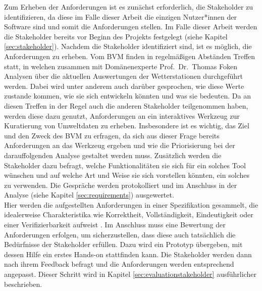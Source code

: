 Zum Erheben der Anforderungen ist es zunächst erforderlich, die Stakeholder zu identifizieren, da diese im Falle dieser Arbeit die einzigen Nutzer*innen der Software sind und somit die Anforderungen stellen. Im Falle dieser Arbeit werden die Stakeholder bereits vor Beginn des Projekts festgelegt (siehe Kapitel \ref{sec:stakeholder}). Nachdem die Stakeholder identifiziert sind, ist es möglich, die Anforderungen zu erheben. Vom \ac{BVM} finden in regelmäßigen Abständen Treffen statt, in welchen zusammen mit Domänenexperte Prof.\ Dr.\ Thomas Foken Analysen über die aktuellen Auswertungen der Wetterstationen durchgeführt werden. Dabei wird unter anderem auch darüber gesprochen, wie diese Werte zustande kommen, wie sie sich entwickeln könnten und was sie bedeuten. Da an diesen Treffen in der Regel auch die anderen Stakeholder teilgenommen haben, werden diese dazu genutzt, Anforderungen an ein interaktives Werkzeug zur Kuratierung von Umweltdaten zu erheben. Insbesondere ist es wichtig, das Ziel und den Zweck des \ac{BVM} zu erfragen, da sich aus dieser Frage bereits Anforderungen an das Werkzeug ergeben und wie die Priorisierung bei der darauffolgenden Analyse gestaltet werden muss. Zusätzlich werden die Stakeholder dazu befragt, welche Funktionalitäten sie sich für ein solches Tool wünschen und auf welche Art und Weise sie sich vorstellen könnten, ein solches zu verwenden. Die Gespräche werden protokolliert und im Anschluss in der Analyse (siehe Kapitel \ref{sec:requirements}) ausgewertet.\\ Hier werden die aufgestellten Anforderungen in einer Spezifikation gesammelt, die idealerweise Charakteristika wie Korrektheit, Vollständigkeit, Eindeutigkeit oder einer Verifizierbarkeit aufweist \cite{institute1984ieee}. Im Anschluss muss eine Bewertung der Anforderungen erfolgen, um sicherzustellen, dass diese auch tatsächlich die Bedürfnisse der Stakeholder erfüllen. Dazu wird ein Prototyp übergeben, mit dessen Hilfe ein erstes Hands-on stattfinden kann. Die Stakeholder werden dann nach ihrem Feedback befragt und die Anforderungen werden entsprechend angepasst. Dieser Schritt wird in Kapitel \ref{sec:evaluationstakeholder} ausführlicher beschrieben. 

